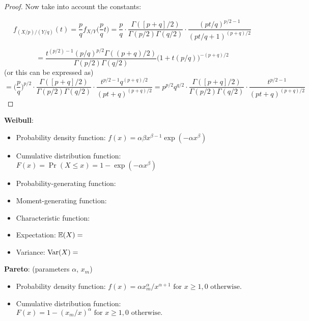 \begin{itemize}
\begin{proof}
Now take into account the constants:

\[
f_{(X/p)/(Y/q)}(t) = \frac{p}{q} f_{X/Y}\bigg( \frac{p}{q} t \bigg) =   \frac{p}{q} \cdot  \frac{\Gamma([p+q]/2)  }{\Gamma(p/2)\Gamma(q/2) } \cdot  \frac{(pt/q)^{p/2-1}   }{  (pt/q+1)^{(p+q)/2} }
\]

\[
= \frac{t^{(p/2)-1}(p/q)^{p/2}\Gamma((p+q)/2)}{\Gamma(p/2)\Gamma(q/2)}\Big(1+t(p/q)\Big)^{-(p+q)/2}
\]
(or this can be expressed as)
\[
 =    \bigg( \frac{p}{q} \bigg)^{p/2} \cdot  \frac{\Gamma([p+q]/2)  }{\Gamma(p/2)\Gamma(q/2) } \cdot  \frac{t^{p/2-1}q^{(p+q)/2}   }{  (pt+q)^{(p+q)/2} }  =   p^{p/2} q^{q/2}  \cdot  \frac{\Gamma([p+q]/2)  }{\Gamma(p/2)\Gamma(q/2) } \cdot  \frac{t^{p/2-1} }{  (pt+q)^{(p+q)/2} }
 \]


\end{proof}



\textbf{Weibull}: 

\begin{itemize}

\item Probability density function: \(f(x) = \alpha\beta x^{\beta - 1} \exp(- \alpha x^\beta) \)

\item Cumulative distribution function: \(F(x) = \Pr(X \leq x) = 1 - \exp(-\alpha x^\beta) \)

\item Probability-generating function:

\item Moment-generating function:

\item Characteristic function:

\item Expectation: \(\mathbb{E}(X) = \)

\item Variance: \(\mathrm{Var}(X) = \)

\end{itemize}

\textbf{Pareto}: (parameters \(\alpha\), \(x_m\))

\begin{itemize}

\item Probability density function: \(f(x) = \alpha x_m^\alpha/x^{\alpha + 1} \text{ for } x \geq 1, 0 \text{ otherwise.} \)

\item Cumulative distribution function: \(F(x) = 1 - (x_m/x)^{\alpha} \text{ for } x \geq 1, 0 \text{ otherwise.}\)


\end{itemize}
\end{itemize}
